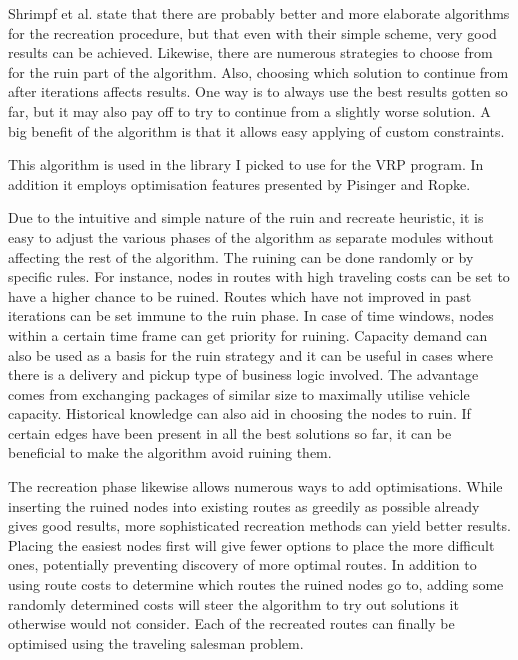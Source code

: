 Shrimpf et al. state that there are probably better and more elaborate algorithms for the recreation procedure, but that even with their simple scheme, very good results can be achieved. Likewise, there are numerous strategies to choose from for the ruin part of the algorithm. Also, choosing which solution to continue from after iterations affects results. One way is to always use the best results gotten so far, but it may also pay off to try to continue from a slightly worse solution. A big benefit of the algorithm is that it allows easy applying of custom constraints. \cite{schrimpf2000record} 

This algorithm is used in the library I picked to use for the VRP program. In addition it employs optimisation features presented by Pisinger and Ropke\cite{pisinger2007general}.

Due to the intuitive and simple nature of the ruin and recreate heuristic, it is easy to adjust the various phases of the algorithm as separate modules without affecting the rest of the algorithm. The ruining can be done randomly or by specific rules. For instance, nodes in routes with high traveling costs can be set to have a higher chance to be ruined. Routes which have not improved in past iterations can be set immune to the ruin phase. In case of time windows, nodes within a certain time frame can get priority for ruining. Capacity demand can also be used as a basis for the ruin strategy and it can be useful in cases where there is a delivery and pickup type of business logic involved. The advantage comes from exchanging packages of similar size to maximally utilise vehicle capacity. Historical knowledge can also aid in choosing the nodes to ruin. If certain edges have been present in all the best solutions so far, it can be beneficial to make the algorithm avoid ruining them. \cite{pisinger2007general}

The recreation phase likewise allows numerous ways to add optimisations. While inserting the ruined nodes into existing routes as greedily as possible already gives good results, more sophisticated recreation methods can yield better results. Placing the easiest nodes first will give fewer options to place the more difficult ones, potentially preventing discovery of more optimal routes. In addition to using route costs to determine which routes the ruined nodes go to, adding some randomly determined costs will steer the algorithm to try out solutions it otherwise would not consider. Each of the recreated routes can finally be optimised using the traveling salesman problem. \cite{pisinger2007general}  

